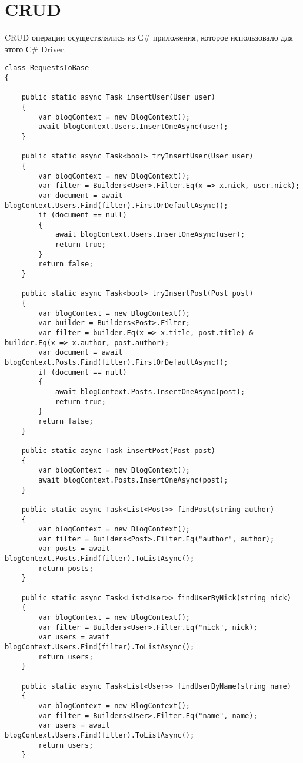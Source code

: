 \documentclass[a4paper]{article}
\begin{document}
\section{CRUD}
CRUD операции осуществлялись из С\# приложения, которое использовало для этого С\# Driver.
\begin{lstlisting}
class RequestsToBase
{

    public static async Task insertUser(User user)
    {
        var blogContext = new BlogContext();
        await blogContext.Users.InsertOneAsync(user);
    }

    public static async Task<bool> tryInsertUser(User user)
    {
        var blogContext = new BlogContext();
        var filter = Builders<User>.Filter.Eq(x => x.nick, user.nick);
        var document = await blogContext.Users.Find(filter).FirstOrDefaultAsync();
        if (document == null)
        {
            await blogContext.Users.InsertOneAsync(user);
            return true;
        }
        return false;
    }

    public static async Task<bool> tryInsertPost(Post post)
    {
        var blogContext = new BlogContext();
        var builder = Builders<Post>.Filter;
        var filter = builder.Eq(x => x.title, post.title) & builder.Eq(x => x.author, post.author);
        var document = await blogContext.Posts.Find(filter).FirstOrDefaultAsync();
        if (document == null)
        {
            await blogContext.Posts.InsertOneAsync(post);
            return true;
        }
        return false;
    }

    public static async Task insertPost(Post post)
    {
        var blogContext = new BlogContext();
        await blogContext.Posts.InsertOneAsync(post);
    }

    public static async Task<List<Post>> findPost(string author)
    {
        var blogContext = new BlogContext();
        var filter = Builders<Post>.Filter.Eq("author", author);
        var posts = await blogContext.Posts.Find(filter).ToListAsync();
        return posts;
    }

    public static async Task<List<User>> findUserByNick(string nick)
    {
        var blogContext = new BlogContext();
        var filter = Builders<User>.Filter.Eq("nick", nick);
        var users = await blogContext.Users.Find(filter).ToListAsync();
        return users;
    }

    public static async Task<List<User>> findUserByName(string name)
    {
        var blogContext = new BlogContext();
        var filter = Builders<User>.Filter.Eq("name", name);
        var users = await blogContext.Users.Find(filter).ToListAsync();
        return users;
    }


\end{lstlisting}
\end{document}
